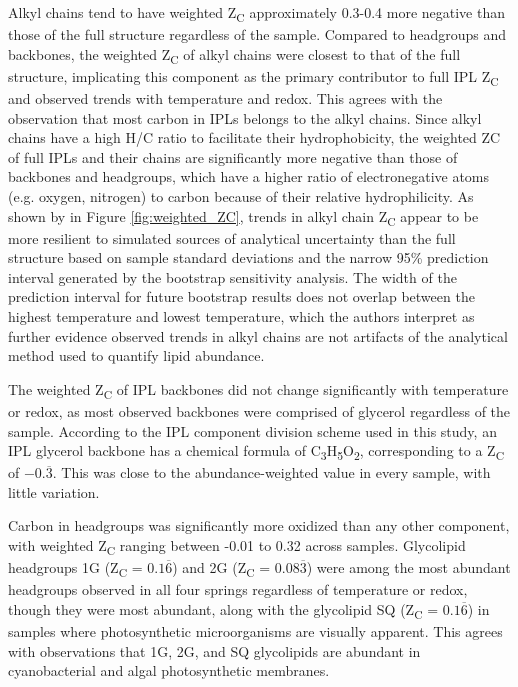 Alkyl chains tend to have weighted Z\textsubscript{C} approximately 0.3-0.4 more negative than those of the full structure regardless of the sample. Compared to headgroups and backbones, the weighted Z\textsubscript{C} of alkyl chains were closest to that of the full structure, implicating this component as the primary contributor to full IPL Z\textsubscript{C} and observed trends with temperature and redox. This agrees with the observation that most carbon in IPLs belongs to the alkyl chains. Since alkyl chains have a high H/C ratio to facilitate their hydrophobicity, the weighted ZC of full IPLs and their chains are significantly more negative than those of backbones and headgroups, which have a higher ratio of electronegative atoms (e.g. oxygen, nitrogen) to carbon because of their relative hydrophilicity. As shown by in Figure \ref{fig:weighted_ZC}, trends in alkyl chain Z\textsubscript{C} appear to be more resilient to simulated sources of analytical uncertainty than the full structure based on sample standard deviations and the narrow 95\% prediction interval generated by the bootstrap sensitivity analysis. The width of the prediction interval for future bootstrap results does not overlap between the highest temperature and lowest temperature, which the authors interpret as further evidence observed trends in alkyl chains are not artifacts of the analytical method used to quantify lipid abundance.

The weighted Z\textsubscript{C} of IPL backbones did not change significantly with temperature or redox, as most observed backbones were comprised of glycerol regardless of the sample. According to the IPL component division scheme used in this study, an IPL glycerol backbone has a chemical formula of C\textsubscript{3}H\textsubscript{5}O\textsubscript{2}, corresponding to a Z\textsubscript{C} of $-0.\overline{3}$. This was close to the abundance-weighted value in every sample, with little variation.

Carbon in headgroups was significantly more oxidized than any other component, with weighted Z\textsubscript{C} ranging between -0.01 to 0.32 across samples. Glycolipid headgroups 1G (Z\textsubscript{C} = $0.1\overline{6}$) and 2G (Z\textsubscript{C} = $0.08\overline{3}$) were among the most abundant headgroups observed in all four springs regardless of temperature or redox, though they were most abundant, along with the glycolipid SQ (Z\textsubscript{C} = $0.1\overline{6}$) in samples where photosynthetic microorganisms are visually apparent. This agrees with observations that 1G, 2G, and SQ glycolipids are abundant in cyanobacterial \citep{wada2009lipids} and algal \citep{guschina2006lipids} photosynthetic membranes.


